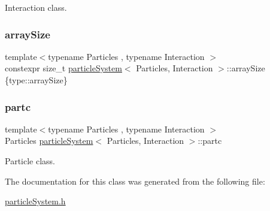 Interaction class. 

\mbox{\label{classparticle_system_a546e31d7390df18688216898c6f610f9}} 
\subsubsection{\texorpdfstring{array\+Size}{arraySize}}
{\footnotesize\ttfamily template$<$typename Particles , typename Interaction $>$ \\
constexpr size\+\_\+t \mbox{\hyperlink{classparticle_system}{particle\+System}}$<$ Particles, Interaction $>$\+::array\+Size \{type\+::array\+Size\}\hspace{0.3cm}{\ttfamily [static]}}

\mbox{\label{classparticle_system_a48cb24fbd9d72503a5e464a02760e814}} 
\subsubsection{\texorpdfstring{partc}{partc}}
{\footnotesize\ttfamily template$<$typename Particles , typename Interaction $>$ \\
Particles \mbox{\hyperlink{classparticle_system}{particle\+System}}$<$ Particles, Interaction $>$\+::partc\hspace{0.3cm}{\ttfamily [protected]}}



Particle class. 



The documentation for this class was generated from the following file\+:\begin{DoxyCompactItemize}
\item 
\mbox{\hyperlink{particle_system_8h}{particle\+System.\+h}}\end{DoxyCompactItemize}
